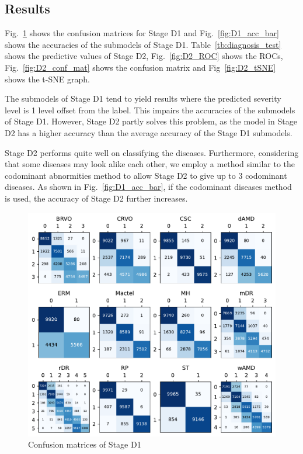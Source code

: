 \documentclass{article}
\begin{document}
\begin{multicols}{2}
	
	\subsection{Results}
	
	Fig.~\ref{fig:D1_conf_mat} shows the confusion matrices for Stage D1 and Fig.~\ref{fig:D1_acc_bar} shows the accuracies of the submodels of Stage D1. Table~\ref{tb:diagnosis_test} shows the predictive values of Stage D2, Fig.~\ref{fig:D2_ROC} shows the ROCs, Fig.~\ref{fig:D2_conf_mat} shows the confusion matrix and Fig~\ref{fig:D2_tSNE} shows the t-SNE graph.
	
	The submodels of Stage D1 tend to yield results where the predicted severity level is 1 level offset from the label. This impairs the accuracies of the submodels of Stage D1. However, Stage D2 partly solves this problem, as the model in Stage D2 has a higher accuracy than the average accuracy of the Stage D1 submodels. 
	
	Stage D2 performs quite well on classifying the diseases. Furthermore, considering that some diseases may look alike each other, we employ a method similar to the codominant abnormities method to allow Stage D2 to give up to 3 codominant diseases. As shown in Fig.~\ref{fig:D1_acc_bar}, if the codominant diseases method is used, the accuracy of Stage D2 further increases. 
	
	\end{multicols}
	
	\begin{figure}[htbp]
		\centering
		\includegraphics[width=\linewidth]{Figs/diagnosis1_confusion_matrix.pdf}
		\caption{Confusion matrices of Stage D1}
		\vspace{0.3cm}
		\label{fig:D1_conf_mat}
	\end{figure}
	
\end{document}
